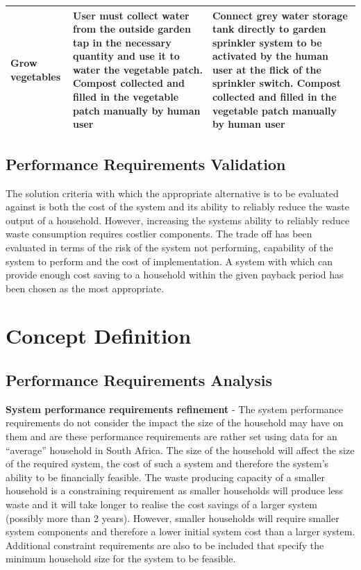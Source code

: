 \documentclass[a4paper,11pt,fleqn]{report}
\begin{document}
\begin{center}
\begin{longtable}{p{3.5cm}|p{5.5cm}|p{5.5cm}}
    \hline
     Grow vegetables & User must collect water from the outside garden tap in the necessary quantity and use it to water the vegetable patch. Compost collected and filled in the vegetable patch manually by human user & Connect grey water storage tank directly to garden sprinkler system to be activated by the human user at the flick of the sprinkler switch. Compost collected and filled in the vegetable patch manually by human user\\
    \hline
    \bottomrule
\end{longtable}
\end{center}
%
	
\subsection{Performance Requirements Validation}
The solution criteria with which the appropriate alternative is to be evaluated against is both the cost of the system and its ability to reliably reduce the waste output of a household. However, increasing the systems ability to reliably reduce waste consumption requires costlier components. The trade off has been evaluated in terms of the risk of the system not performing, capability of the system to perform and the cost of implementation. A system with which can provide enough cost saving to a household within the given payback period has been chosen as the most appropriate. 



\section{Concept Definition}
\subsection{Performance Requirements Analysis}
\textbf{System performance requirements refinement} - The system performance requirements do not consider the impact the size of the household may have on them and are these performance requirements are rather set using data for an “average” household in South Africa. The size of the household will affect the size of the required system, the cost of such a system and therefore the system’s ability to be financially feasible. The waste producing capacity of a smaller household is a constraining requirement as smaller households will produce less waste and it will take longer to realise the cost savings of a larger system (possibly more than 2 years). However, smaller households will require smaller system components and therefore a lower initial system cost than a larger system. Additional constraint requirements are also to be included that specify the minimum household size for the system to be feasible.
\end{document}
